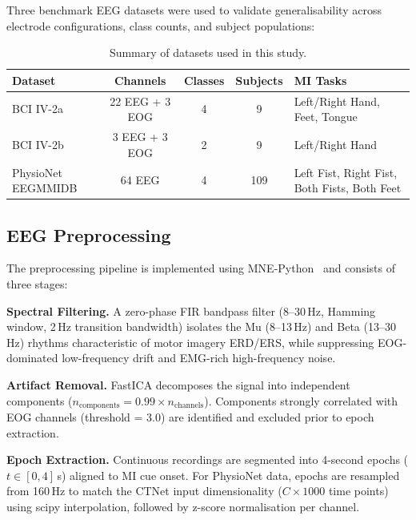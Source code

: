 \documentclass[12pt, a4paper]{article}
\begin{document}
Three benchmark EEG datasets were used to validate generalisability across electrode configurations, class counts, and subject populations:

\begin{table}[htbp]
\centering
\caption{Summary of datasets used in this study.}
\label{tab:datasets}
\begin{tabular}{lcccl}
\toprule
\textbf{Dataset} & \textbf{Channels} & \textbf{Classes} & \textbf{Subjects} & \textbf{MI Tasks} \\
\midrule
BCI IV-2a & 22 EEG + 3 EOG & 4 & 9 & Left/Right Hand, Feet, Tongue \\
BCI IV-2b & 3 EEG + 3 EOG & 2 & 9 & Left/Right Hand \\
PhysioNet EEGMMIDB & 64 EEG & 4 & 109 & Left Fist, Right Fist, Both Fists, Both Feet \\
\bottomrule
\end{tabular}
\end{table}

\subsection{EEG Preprocessing}

The preprocessing pipeline is implemented using MNE-Python~\cite{gramfort2013mne} and consists of three stages:

\textbf{Spectral Filtering.} A zero-phase FIR bandpass filter (8--30\,Hz, Hamming window, 2\,Hz transition bandwidth) isolates the Mu (8--13\,Hz) and Beta (13--30\,Hz) rhythms characteristic of motor imagery ERD/ERS, while suppressing EOG-dominated low-frequency drift and EMG-rich high-frequency noise.

\textbf{Artifact Removal.} FastICA decomposes the signal into independent components ($n_\text{components} = 0.99 \times n_\text{channels}$). Components strongly correlated with EOG channels (threshold = 3.0) are identified and excluded prior to epoch extraction.

\textbf{Epoch Extraction.} Continuous recordings are segmented into 4-second epochs ($t \in [0, 4]$\,s) aligned to MI cue onset. For PhysioNet data, epochs are resampled from 160\,Hz to match the CTNet input dimensionality ($C \times 1000$ time points) using scipy interpolation, followed by z-score normalisation per channel.

\end{document}
